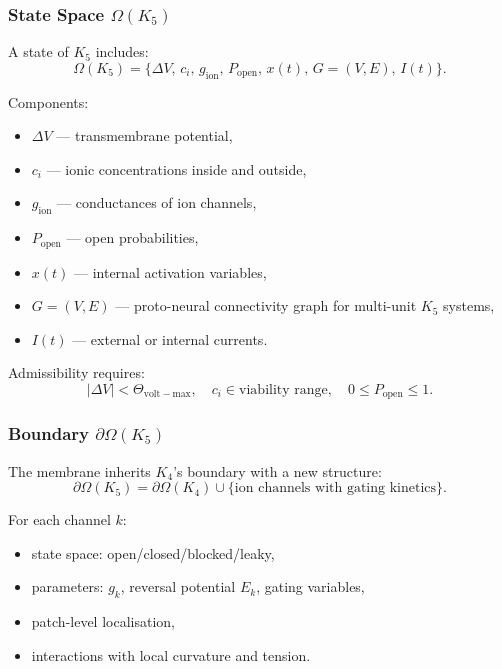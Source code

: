 \subsubsection{State Space \texorpdfstring{$\Omega(K_5)$}{\Omega(K_5)}}

A state of $K_5$ includes:
\[
\Omega(K_5) = \{ \Delta V,\, c_i,\, g_{\mathrm{ion}},\,
                P_{\mathrm{open}},\,
                x(t),\,
                G=(V,E),\,
                I(t) \}.
\]

Components:
\begin{itemize}
    \item $\Delta V$ — transmembrane potential,
    \item $c_i$ — ionic concentrations inside and outside,
    \item $g_{\mathrm{ion}}$ — conductances of ion channels,
    \item $P_{\mathrm{open}}$ — open probabilities,
    \item $x(t)$ — internal activation variables,
    \item $G=(V,E)$ — proto-neural connectivity graph for multi-unit
          $K_5$ systems,
    \item $I(t)$ — external or internal currents.
\end{itemize}

Admissibility requires:
\[
|\Delta V| < \Theta_{\mathrm{volt-max}}, \quad
c_i \in \text{viability range}, \quad
0 \le P_{\mathrm{open}} \le 1.
\]

\subsubsection{Boundary \texorpdfstring{$\partial\Omega(K_5)$}{\partial\Omega(K_5)}}

The membrane inherits $K_4$'s boundary with a new structure:
\[
\partial\Omega(K_5)
    = \partial\Omega(K_4)
      \cup \{ \text{ion channels with gating kinetics} \}.
\]

For each channel $k$:
\begin{itemize}
    \item state space: open/closed/blocked/leaky,
    \item parameters: $g_k$, reversal potential $E_k$, gating variables,
    \item patch-level localisation,
    \item interactions with local curvature and tension.
\end{itemize}

